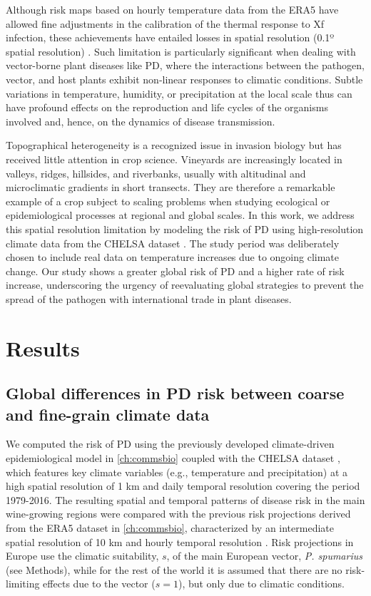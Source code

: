 Although risk maps based on hourly temperature data from the ERA5 have
allowed fine adjustments in the calibration of the thermal response to Xf
infection, these achievements have entailed losses in spatial resolution (0.1º
spatial resolution) \cite{GimenezRomero2022_CommsBio, ERA5_dataset}. Such
limitation is particularly significant when dealing with vector-borne plant
diseases like PD, where the interactions between the pathogen, vector, and host
plants exhibit non-linear responses to climatic conditions. Subtle variations
in temperature, humidity, or precipitation at the local scale thus can have
profound effects on the reproduction and life cycles of the organisms involved
and, hence, on the dynamics of disease transmission.

Topographical heterogeneity is a recognized issue in invasion biology but
has received little attention in crop science.	Vineyards are increasingly
located in valleys, ridges, hillsides, and riverbanks, usually with altitudinal
and microclimatic gradients in short transects.  They are therefore a
remarkable example of  a crop subject to scaling problems when studying
ecological or epidemiological processes at  regional and global scales. In this
work, we address this spatial resolution limitation by modeling the risk of PD
using high-resolution climate data from the CHELSA dataset \cite{Karger2017}.
The study period was deliberately chosen  to include real data on temperature
increases due to ongoing climate change. Our study shows a greater global risk
of PD and a higher rate of risk increase, underscoring the urgency of
reevaluating global strategies to prevent the spread of the pathogen with
international trade in plant diseases.

\section{Results}

\subsection{Global differences in  PD risk between coarse and fine-grain
    climate data}

We computed the risk of PD using the previously developed climate-driven
epidemiological model in \cref{ch:commsbio} \cite{GimenezRomero2022_CommsBio}
coupled with the CHELSA dataset \cite{Karger2017}, which features key climate
variables (e.g., temperature and precipitation) at a high spatial resolution of
1 km and daily temporal resolution covering the period 1979-2016. The resulting
spatial and temporal patterns of disease risk in the main wine-growing regions
were compared with the previous risk projections derived from the ERA5 dataset
\cite{munoz-sabater_era5-land_2021} in \cref{ch:commsbio}, characterized by an
intermediate  spatial resolution of 10 km  and hourly temporal resolution
\cite{GimenezRomero2022_CommsBio}. Risk projections in Europe use the
climatic suitability, $s$, of the main European vector, \textit{P. spumarius}
(see Methods), while for the rest of the world it is assumed that there are no
risk-limiting effects due to the vector  ($s=1$), but only due to climatic
conditions.

